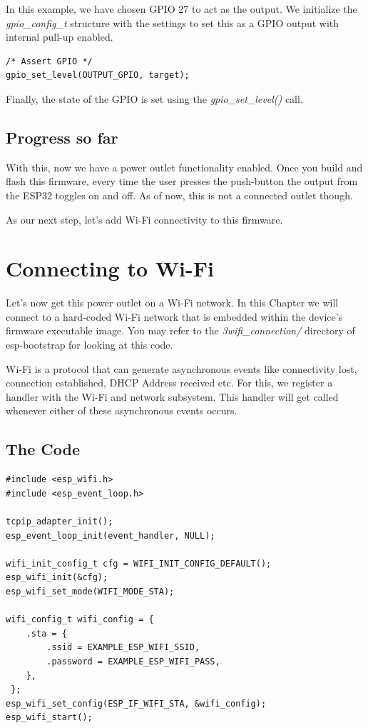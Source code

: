 \documentclass[11pt,fleqn]{book} %
\begin{document}
In this example, we have chosen GPIO 27 to act as the output. We initialize the \textit{gpio\_config\_t} structure with the settings to set this as a GPIO output with internal pull-up enabled.

\begin{verbatim}
/* Assert GPIO */
gpio_set_level(OUTPUT_GPIO, target);

\end{verbatim}

Finally, the state of the GPIO is set using the \textit{gpio\_set\_level()} call.

\section{Progress so far}
With this, now we have a power outlet functionality enabled. Once you build and flash this firmware, every time the user presses the push-button the output from the ESP32 toggles on and off. As of now, this is not a connected outlet though. 

As our next step, let's add Wi-Fi connectivity to this firmware.



\chapter{Connecting to Wi-Fi}
Let's now get this power outlet on a Wi-Fi network. In this Chapter we will connect to a hard-coded Wi-Fi network that is embedded within the device's firmware executable image. You may refer to the \textit{3wifi\_connection/} directory of esp-bootstrap for looking at this code.

Wi-Fi is a protocol that can generate asynchronous events like connectivity lost, connection established, DHCP Address received etc. For this, we register a handler with the Wi-Fi and network subsystem. This handler will get called whenever either of these asynchronous events occurs.

\section{The Code}
\begin{verbatim}
#include <esp_wifi.h>
#include <esp_event_loop.h>

tcpip_adapter_init();
esp_event_loop_init(event_handler, NULL);

wifi_init_config_t cfg = WIFI_INIT_CONFIG_DEFAULT();
esp_wifi_init(&cfg);
esp_wifi_set_mode(WIFI_MODE_STA);

wifi_config_t wifi_config = {
    .sta = {
        .ssid = EXAMPLE_ESP_WIFI_SSID,
        .password = EXAMPLE_ESP_WIFI_PASS,
    },
 };
esp_wifi_set_config(ESP_IF_WIFI_STA, &wifi_config);
esp_wifi_start();

\end{verbatim}
\end{document}
